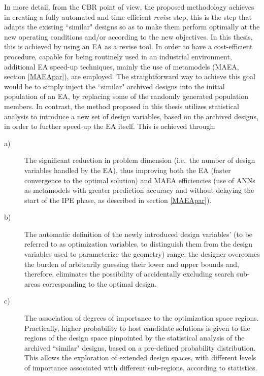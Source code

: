 In more detail, from the CBR point of view, the proposed methodology achieves in creating a fully automated and time-efficient \textit{revise} step, this is the step that adapts the existing ``similar" designs so as to make them perform optimally at the new operating conditions and/or according to the new objectives. In this thesis, this is achieved by using an EA as a revise tool. In order to have a cost-efficient procedure, capable for being routinely used in an industrial environment, additional EA speed-up techniques, mainly the use of metamodels (MAEA, section \ref{MAEApar}), are employed. The straightforward way to achieve this goal would be to simply inject the ``similar" archived designs into the initial population of an EA, by replacing some of the randomly generated population members.
In contrast, the method proposed in this thesis utilizes statistical analysis to introduce a new set of design variables, based on the archived designs, in order to further speed-up the EA itself. This is achieved through:  
\begin{description}
  \item[a)]The significant reduction in problem dimension (i.e.\ the number of design variables handled by the EA), thus improving both the EA (faster convergence to the optimal solution) and MAEA efficiencies (use of ANNs as metamodels  with greater prediction accuracy and without delaying the start of the IPE phase, as described in section \ref{MAEApar}). 
  \item[b)]The automatic definition of the newly introduced design variables' (to be referred to as optimization variables, to distinguish them from the design variables used to parameterize the geometry) range; the designer overcomes the burden of arbitrarily guessing their lower and upper bounds and, therefore, eliminates the possibility of accidentally excluding search sub-areas corresponding to the optimal design. 
    \item[c)]The association of degrees of importance to the optimization space regions. Practically, higher probability to host candidate solutions is given to the regions of the design space pinpointed by the statistical analysis of the archived ``similar" designs, based on a pre-defined probability distribution. This allows the exploration of extended design spaces, with different levels of importance associated with different sub-regions, according to statistics.
\end{description}


